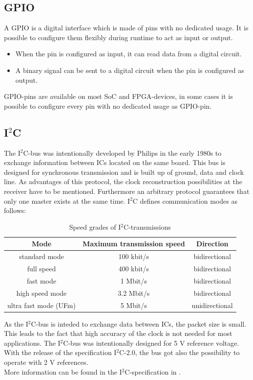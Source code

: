 \subsection{GPIO}
A GPIO is a digital interface which is made of pins with no dedicated usage. It is possible to configure them flexibly during runtime to act as input or output.
\begin{itemize}
\item When the pin is configured as input, it can read data from a digital circuit.
\item A binary signal can be sent to a digital circuit when the pin is configured as output.
\end{itemize}
GPIO-pins are available on most SoC and FPGA-devices, in some cases it is possible to configure every pin with no dedicated usage as GPIO-pin.\cite{kernelgpio15}
\subsection{I$^2$C}
The I$^2$C-bus was intentionally developed by Philips in the early 1980s to exchange information between ICs located on the same board. This bus is designed for synchronous transmission and is built up of ground, data and clock line. As advantages of this protocol, the clock reconstruction possibilities at the receiver have to be mentioned. Furthermore an arbitrary protocol guarantees that only one master exists at the same time.\cite{Wue06} I$^2$C defines communication modes as follows:
\begin{table}
\begin{center}
\begin{tabular}{|c||c|c|}
\hline
Mode & Maximum transmission speed & Direction\\
\hline\hline
standard mode & 100 kbit/s & bidirectional\\
\hline
full speed & 400 kbit/s & bidirectional\\
\hline
fast mode & 1 Mbit/s & bidirectional\\
\hline
high speed mode & 3.2 Mbit/s & bidirectional\\
\hline
ultra fast mode (UFm) & 5 Mbit/s & unidirectional\\
\hline
\end{tabular}
\caption{Speed grades of I$^2$C-transmissions\cite{I2Cspeed}}
\label{tab:rsstates}
\end{center}
\end{table}
As the I$^2$C-bus is inteded to exchange data between ICs, the packet size is small. This leads to the fact that high accuracy of the clock is not needed for most applications.\cite{I2Cspeed} The I$^2$C-bus was intentionally designed for 5 V reference voltage. With the release of the specification I$^2$C-2.0, the bus got also the possibility to operate with 2 V references.\cite{I2Cvoltage}\\
More information can be found in the I$^2$C-specification in \cite{I2Cspec}.
